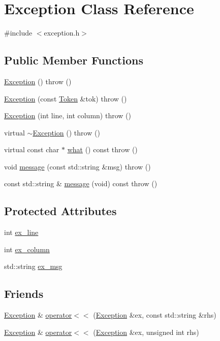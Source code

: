 \hypertarget{class_exception}{
\section{Exception Class Reference}
\label{class_exception}
}


{\ttfamily \#include $<$exception.h$>$}

\subsection*{Public Member Functions}
\begin{DoxyCompactItemize}
\item 
\hyperlink{class_exception_a1b78336bb26edf8e784783cc150c5801}{Exception} ()  throw ()
\item 
\hyperlink{class_exception_abfa91380075acb0b040b401ace9885d8}{Exception} (const \hyperlink{class_token}{Token} \&tok)  throw ()
\item 
\hyperlink{class_exception_aa049354d27370ca0176a16c5ed7394e9}{Exception} (int line, int column)  throw ()
\item 
virtual \hyperlink{class_exception_ad1ba411de295ef2eeb02ba26284a829a}{$\sim$Exception} ()  throw ()
\item 
virtual const char $\ast$ \hyperlink{class_exception_a380f0477d9ef319911e7a8167bd47f1f}{what} () const   throw ()
\item 
void \hyperlink{class_exception_a2514fc52bf060e2d242f5e6f1b87e8bf}{message} (const std::string \&msg)  throw ()
\item 
const std::string \& \hyperlink{class_exception_a8f4eb20583b892ce7b0fb55554a94156}{message} (void) const   throw ()
\end{DoxyCompactItemize}
\subsection*{Protected Attributes}
\begin{DoxyCompactItemize}
\item 
int \hyperlink{class_exception_ab30bf54ebcf9ead45300ce422fb4b6b8}{ex\_\-line}
\item 
int \hyperlink{class_exception_a5a08b0f7c24a639573c36ace567348c4}{ex\_\-column}
\item 
std::string \hyperlink{class_exception_ac106ae3b8d10ae97ee0b71a270fbda27}{ex\_\-msg}
\end{DoxyCompactItemize}
\subsection*{Friends}
\begin{DoxyCompactItemize}
\item 
\hyperlink{class_exception}{Exception} \& \hyperlink{class_exception_a14ad8d29bc8d9f4eb8d2a0b0e5b1047f}{operator$<$$<$} (\hyperlink{class_exception}{Exception} \&ex, const std::string \&rhs)
\item 
\hyperlink{class_exception}{Exception} \& \hyperlink{class_exception_a96bb231c8f8c68239c83b6fa691e02b4}{operator$<$$<$} (\hyperlink{class_exception}{Exception} \&ex, unsigned int rhs)
\end{DoxyCompactItemize}


